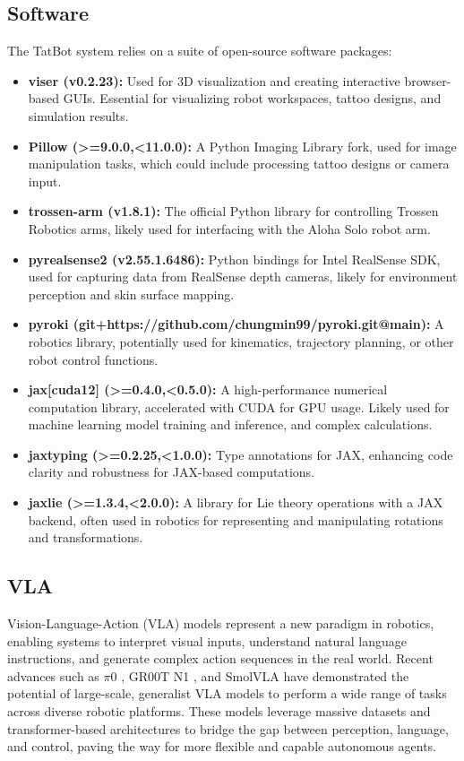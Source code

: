 \documentclass[11pt]{article}
\begin{document}
\subsection{Software}

The TatBot system relies on a suite of open-source software packages:
\begin{itemize}
    \item \textbf{viser (v0.2.23):} Used for 3D visualization and creating interactive browser-based GUIs. Essential for visualizing robot workspaces, tattoo designs, and simulation results.
    \item \textbf{Pillow (>=9.0.0,<11.0.0):} A Python Imaging Library fork, used for image manipulation tasks, which could include processing tattoo designs or camera input.
    \item \textbf{trossen-arm (v1.8.1):} The official Python library for controlling Trossen Robotics arms, likely used for interfacing with the Aloha Solo robot arm.
    \item \textbf{pyrealsense2 (v2.55.1.6486):} Python bindings for Intel RealSense SDK, used for capturing data from RealSense depth cameras, likely for environment perception and skin surface mapping.
    \item \textbf{pyroki (git+https://github.com/chungmin99/pyroki.git@main):} A robotics library, potentially used for kinematics, trajectory planning, or other robot control functions.
    \item \textbf{jax[cuda12] (>=0.4.0,<0.5.0):} A high-performance numerical computation library, accelerated with CUDA for GPU usage. Likely used for machine learning model training and inference, and complex calculations.
    \item \textbf{jaxtyping (>=0.2.25,<1.0.0):} Type annotations for JAX, enhancing code clarity and robustness for JAX-based computations.
    \item \textbf{jaxlie (>=1.3.4,<2.0.0):} A library for Lie theory operations with a JAX backend, often used in robotics for representing and manipulating rotations and transformations.
\end{itemize}

\subsection{VLA}

Vision-Language-Action (VLA) models represent a new paradigm in robotics, enabling systems to interpret visual inputs, understand natural language instructions, and generate complex action sequences in the real world.
Recent advances such as $\pi$0 \cite{Black2024pi0}, GR00T N1 \cite{Bjorck2025gr00t}, and SmolVLA \cite{Shukor2025smolvla} have demonstrated the potential of large-scale, generalist VLA models to perform a wide range of tasks across diverse robotic platforms.
These models leverage massive datasets and transformer-based architectures to bridge the gap between perception, language, and control, paving the way for more flexible and capable autonomous agents.
\end{document}
